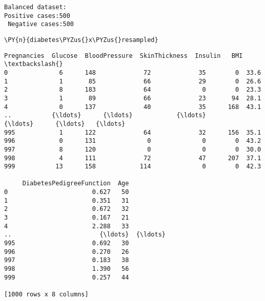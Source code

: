    \begin{Verbatim}[commandchars=\\\{\}]
Balanced dataset:
Positive cases:500
 Negative cases:500
    \end{Verbatim}

    \begin{tcolorbox}[breakable, size=fbox, boxrule=1pt, pad at break*=1mm,colback=cellbackground, colframe=cellborder]
\begin{Verbatim}[commandchars=\\\{\}]
\PY{n}{diabetes\PYZus{}x\PYZus{}resampled}
\end{Verbatim}
\end{tcolorbox}

            \begin{tcolorbox}[breakable, size=fbox, boxrule=.5pt, pad at break*=1mm, opacityfill=0]
\begin{Verbatim}[commandchars=\\\{\}]
     Pregnancies  Glucose  BloodPressure  SkinThickness  Insulin   BMI  \textbackslash{}
0              6      148             72             35        0  33.6
1              1       85             66             29        0  26.6
2              8      183             64              0        0  23.3
3              1       89             66             23       94  28.1
4              0      137             40             35      168  43.1
..           {\ldots}      {\ldots}            {\ldots}            {\ldots}      {\ldots}   {\ldots}
995            1      122             64             32      156  35.1
996            0      131              0              0        0  43.2
997            8      120              0              0        0  30.0
998            4      111             72             47      207  37.1
999           13      158            114              0        0  42.3

     DiabetesPedigreeFunction  Age
0                       0.627   50
1                       0.351   31
2                       0.672   32
3                       0.167   21
4                       2.288   33
..                        {\ldots}  {\ldots}
995                     0.692   30
996                     0.270   26
997                     0.183   38
998                     1.390   56
999                     0.257   44

[1000 rows x 8 columns]
\end{Verbatim}
\end{tcolorbox}
        
